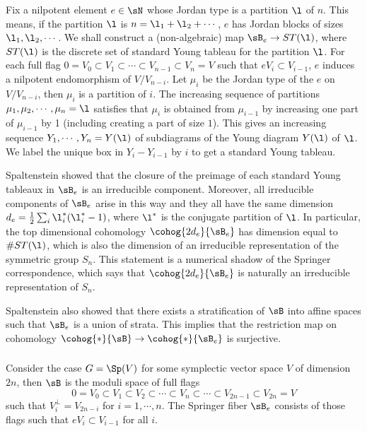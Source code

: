 Fix a nilpotent element $e\in\sN$ whose Jordan type is a partition $\l$ of $n$. This means, if the partition $\l$ is $n=\l_{1}+\l_{2}+\cdots$, $e$ has Jordan blocks of sizes $\l_{1},\l_{2},\cdots$. We shall construct a (non-algebraic) map $\sB_{e}\to ST(\l)$, where $ST(\l)$ is the discrete set of standard Young tableau for the partition $\l$. For each full flag $0=V_{0}\subset V_{1}\subset\cdots\subset V_{n-1}\subset V_{n}=V$ such that $eV_{i}\subset V_{i-1}$, $e$ induces a nilpotent endomorphism of $V/V_{n-i}$. Let $\mu_{i}$ be the Jordan type of the $e$ on $V/V_{n-i}$, then $\mu_{i}$ is a partition of $i$. The increasing sequence of partitions $\mu_{1},\mu_{2},\cdots, \mu_{n}=\l$ satisfies that $\mu_{i}$ is obtained from $\mu_{i-1}$ by increasing one part of $\mu_{i-1}$ by 1 (including creating a part of size $1$). This gives an increasing sequence $Y_{1},\cdots, Y_{n}=Y(\l)$ of subdiagrams of the Young diagram $Y(\l)$ of $\l$. We label the unique box in $Y_{i}-Y_{i-1}$ by $i$ to get a standard Young tableau.
 
Spaltenstein \cite[Ch II, Prop 5.5]{Spaltenstein} showed that the closure of the preimage of each standard Young tableaux in $\sB_{e}$ is an irreducible component. Moreover, all irreducible components of $\sB_{e}$ arise in this way and they all have the same dimension $d_{e}=\frac{1}{2}\sum_{i}\l^{*}_{i}(\l^{*}_{i}-1)$, where $\l^{*}$ is the conjugate partition of $\l$. In particular, the top dimensional cohomology $\cohog{2d_{e}}{\sB_{e}}$ has dimension equal to $\#ST(\l)$, which is also the dimension of an irreducible representation of the symmetric group $S_{n}$. This statement is a numerical shadow of the Springer correspondence, which says that $\cohog{2d_{e}}{\sB_{e}}$ is naturally an irreducible representation of $S_{n}$. 

Spaltenstein \cite[Ch II, Prop 5.9]{Spaltenstein} also showed that there exists a stratification of $\sB$ into affine spaces such that $\sB_{e}$ is a union of strata. This implies that the restriction map on cohomology $\cohog{*}{\sB}\to \cohog{*}{\sB_{e}}$ is surjective. 


\subsubsection{}\label{sss:Sp4} Consider the case $G=\Sp(V)$ for some symplectic vector space $V$ of dimension $2n$, then $\sB$ is the moduli space of full flags
\begin{equation*}
0=V_{0}\subset V_{1}\subset V_{2}\subset\cdots\subset V_{n}\subset\cdots\subset V_{2n-1}\subset V_{2n}=V
\end{equation*}
such that $V^{\bot}_{i}=V_{2n-i}$ for $i=1,\cdots, n$. The Springer fiber $\sB_{e}$ consists of those flags such that $eV_{i}\subset V_{i-1}$ for all $i$.


